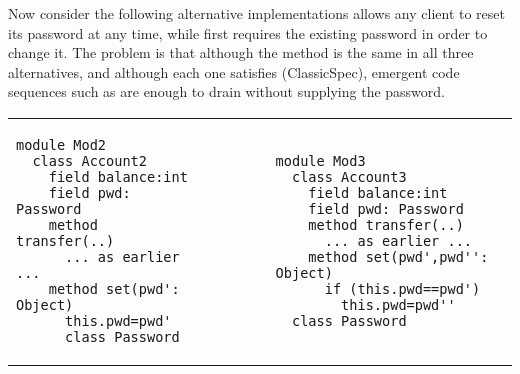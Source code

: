  

Now consider the following alternative implementations
 allows any client to reset its password at any time, while
 first requires the existing password in order to change it.
The problem is that although the  method is the same in
all three alternatives, and although each one satisfies (ClassicSpec),
emergent code sequences such as
%
%
are enough to drain  without supplying the password.


  
%
  
  
\begin{tabular}{lll}
  \begin{minipage}{0.35\textwidth}
    \vfill
\begin{lstlisting}[language=chainmail]
module Mod2
  class Account2
    field balance:int 
    field pwd: Password 
    method transfer(..) 
      ... as earlier ...
    method set(pwd': Object)
      this.pwd=pwd'
      class Password
\end{lstlisting}
\end{minipage}
  &\ \ \  \ \   &
\begin{minipage}{0.50\textwidth}
\begin{lstlisting}[language=chainmail]
module Mod3
  class Account3
    field balance:int 
    field pwd: Password 
    method transfer(..) 
      ... as earlier ...
    method set(pwd',pwd'': Object)
      if (this.pwd==pwd') 
        this.pwd=pwd''
  class Password
\end{lstlisting}
\end{minipage} 
 \end{tabular}


